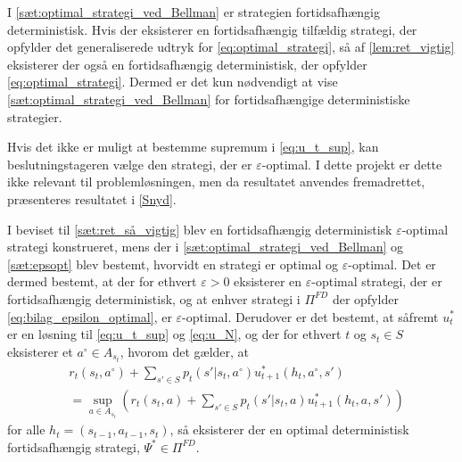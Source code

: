 I \autoref{sæt:optimal_strategi_ved_Bellman} er strategien fortidsafhængig deterministisk. Hvis der eksisterer en fortidsafhængig tilfældig strategi, der opfylder det generaliserede udtryk for \eqref{eq:optimal_strategi}, så af \autoref{lem:ret_vigtig} eksisterer der også en fortidsafhængig deterministisk, der opfylder \eqref{eq:optimal_strategi}. Dermed er det kun nødvendigt at vise \autoref{sæt:optimal_strategi_ved_Bellman} for fortidsafhængige deterministiske strategier. 






Hvis det ikke er muligt at bestemme supremum i \eqref{eq:u_t_sup}, kan beslutningstageren vælge den strategi, der er $\varepsilon$-optimal. I dette projekt er dette ikke relevant til problemløsningen, men da resultatet anvendes fremadrettet, præsenteres resultatet i \autoref{Snyd}.

I beviset til \autoref{sæt:ret_så_vigtig} blev en fortidsafhængig deterministisk $\varepsilon$-optimal strategi konstrueret, mens der i \autoref{sæt:optimal_strategi_ved_Bellman} og \autoref{sæt:epsopt} blev bestemt, hvorvidt en strategi er optimal og $\varepsilon$-optimal. Det er dermed bestemt, at der for ethvert $\varepsilon> 0$ eksisterer en $\varepsilon$-optimal strategi, der er fortidsafhængig deterministisk, og at enhver strategi i $\Pi^{FD}$ der opfylder \eqref{eq:bilag_epsilon_optimal}, er $\varepsilon$-optimal. Derudover er det bestemt, at såfremt $u_t^*$ er en løsning til \eqref{eq:u_t_sup} og \eqref{eq:u_N}, og der for ethvert $t$ og $s_t\in S$ eksisterer et $a^{\circ}\in A_{s_t}$, hvorom det gælder, at
%
\begin{align}\label{eq:deterministisk_fortidsafhængig_sup}
    &r_t(s_t,a^{\circ}) + \sum_{s'\in S}p_t(s' | s_t,a^{\circ})u^*_{t+1}(h_t, a^{\circ},s')\nonumber \\
    &= \sup_{a \in A_{s_t}}\left(r_t(s_t,a) +  \sum_{s'\in S}p_t(s' | s_t,a)u^*_{t+1}(h_t, a,s')\right)
\end{align}
for alle $h_t=(s_{t-1}, a_{t-1}, s_t)$, så eksisterer der en optimal deterministisk fortidsafhængig strategi, $\Psi^*\in \Pi^{FD}$.

